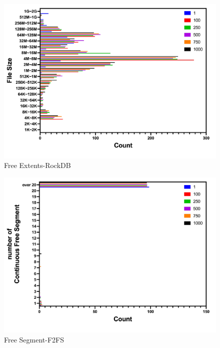 \begin{figure}[t]
    \centering
	\includegraphics[width=0.95\columnwidth]{graphs/free_extents_rocksdb}
	\caption{Free Extents-RockDB}
	\label{f:free_extents_rocksdb}
\end{figure}

\begin{figure}[t]
    \centering
	\includegraphics[width=0.95\columnwidth]{graphs/free_segment_f2fs}
	\caption{Free Segment-F2FS}
	\label{f:free_segment_f2fs}
\end{figure}

